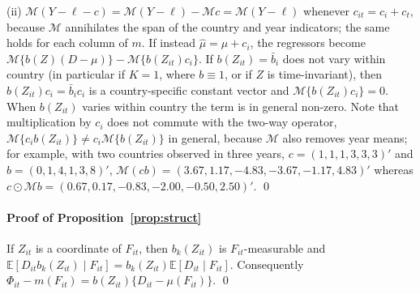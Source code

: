 \documentclass[pdflatex,sn-basic]{sn-jnl}%
\theoremstyle{thmstyleone}
\theoremstyle{thmstyletwo}
\newcommand{\E}{\mathbb{E}}
\newcommand{\M}{\mathcal{M}}
\begin{document}
\begin{appendices}
(ii) $\M(Y-\ell-c)=\M(Y-\ell)-\M c=\M(Y-\ell)$ whenever $c_{it}=c_i+c_t$, because $\M$ annihilates the span of the country and year indicators; the same holds for each column of $m$. If instead $\hat\mu=\mu+c_i$, the regressors become $\M\{b(Z)(D-\mu)\}-\M\{b(Z_{it})c_i\}$. If $b(Z_{it})=\bar b_i$ does not vary within country (in particular if $K=1$, where $b\equiv1$, or if $Z$ is time-invariant), then $b(Z_{it})c_i=\bar b_ic_i$ is a country-specific constant vector and $\M\{b(Z_{it})c_i\}=0$. When $b(Z_{it})$ varies within country the term is in general non-zero. Note that multiplication by $c_i$ does not commute with the two-way operator, $\M\{c_ib(Z_{it})\}\neq c_i\M\{b(Z_{it})\}$ in general, because $\M$ also removes year means; for example, with two countries observed in three years, $c=(1,1,1,3,3,3)'$ and $b=(0,1,4,1,3,8)'$, $\M(cb)=(3.67,1.17,-4.83,-3.67,-1.17,4.83)'$ whereas $c\odot\M b=(0.67,0.17,-0.83,-2.00,-0.50,2.50)'$. \qed

\paragraph{Proof of Proposition~\ref{prop:struct}}
If $Z_{it}$ is a coordinate of $F_{it}$, then $b_k(Z_{it})$ is $F_{it}$-measurable and $\E[D_{it}b_k(Z_{it})\mid F_{it}]=b_k(Z_{it})\E[D_{it}\mid F_{it}]$. Consequently $\Phi_{it}-m(F_{it})=b(Z_{it})\{D_{it}-\mu(F_{it})\}$. \qed


\end{appendices}
\end{document}
